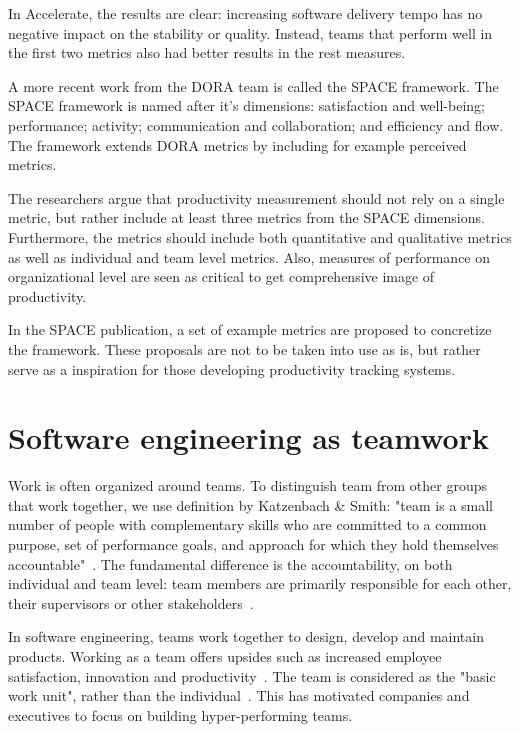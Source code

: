 In Accelerate, the results are clear: increasing software delivery tempo has no negative impact on the stability or quality. Instead, teams that perform well in the first two metrics also had better results in the rest measures. 

A more recent work from the DORA team is called the SPACE framework. The SPACE framework is named after it's dimensions: satisfaction and well-being; performance; activity; communication and collaboration; and efficiency and flow. The framework extends DORA metrics by including for example perceived metrics. 

The researchers argue that productivity measurement should not rely on a single metric, but rather include at least three metrics from the SPACE dimensions. Furthermore, the metrics should include both quantitative and qualitative metrics as well as individual and team level metrics. Also, measures of performance on organizational level are seen as critical to get comprehensive image of productivity. 

In the SPACE publication, a set of example metrics are proposed to concretize the framework. These proposals are not to be taken into use as is, but rather serve as a inspiration for those developing productivity tracking systems.~\cite{forsgren_space_2021}

\section{Software engineering as teamwork}

Work is often organized around teams. To distinguish team from other groups that work together, we use definition by Katzenbach \& Smith: "team is a small number of people with complementary skills who are committed to a common purpose, set of performance goals, and approach for which they hold themselves accountable"~\cite{katzenbach_discipline_1993}. The fundamental difference is the accountability, on both individual and team level: team members are primarily responsible for each other, their supervisors or other stakeholders~\cite{katzenbach_discipline_1993}.

In software engineering, teams work together to design, develop and maintain products. Working as a team offers upsides such as increased employee satisfaction, innovation and productivity~\cite{moe_teamwork_2010}. The team is considered as the "basic work unit", rather than the individual~\cite{moe_overcoming_2010}. This has motivated companies and executives to focus on building hyper-performing teams.

